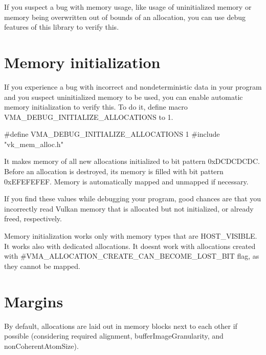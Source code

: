 If you suspect a bug with memory usage, like usage of uninitialized memory or memory being overwritten out of bounds of an allocation, you can use debug features of this library to verify this.\hypertarget{debugging_memory_usage_debugging_memory_usage_initialization}{}\section{Memory initialization}\label{debugging_memory_usage_debugging_memory_usage_initialization}
If you experience a bug with incorrect and nondeterministic data in your program and you suspect uninitialized memory to be used, you can enable automatic memory initialization to verify this. To do it, define macro {\ttfamily V\+M\+A\+\_\+\+D\+E\+B\+U\+G\+\_\+\+I\+N\+I\+T\+I\+A\+L\+I\+Z\+E\+\_\+\+A\+L\+L\+O\+C\+A\+T\+I\+O\+NS} to 1.


\begin{DoxyCode}
\textcolor{preprocessor}{#define VMA\_DEBUG\_INITIALIZE\_ALLOCATIONS 1}
\textcolor{preprocessor}{#include "vk\_mem\_alloc.h"}
\end{DoxyCode}


It makes memory of all new allocations initialized to bit pattern {\ttfamily 0x\+D\+C\+D\+C\+D\+C\+DC}. Before an allocation is destroyed, its memory is filled with bit pattern {\ttfamily 0x\+E\+F\+E\+F\+E\+F\+EF}. Memory is automatically mapped and unmapped if necessary.

If you find these values while debugging your program, good chances are that you incorrectly read Vulkan memory that is allocated but not initialized, or already freed, respectively.

Memory initialization works only with memory types that are {\ttfamily H\+O\+S\+T\+\_\+\+V\+I\+S\+I\+B\+LE}. It works also with dedicated allocations. It doesn\textquotesingle{}t work with allocations created with \#\+V\+M\+A\+\_\+\+A\+L\+L\+O\+C\+A\+T\+I\+O\+N\+\_\+\+C\+R\+E\+A\+T\+E\+\_\+\+C\+A\+N\+\_\+\+B\+E\+C\+O\+M\+E\+\_\+\+L\+O\+S\+T\+\_\+\+B\+IT flag, as they cannot be mapped.\hypertarget{debugging_memory_usage_debugging_memory_usage_margins}{}\section{Margins}\label{debugging_memory_usage_debugging_memory_usage_margins}
By default, allocations are laid out in memory blocks next to each other if possible (considering required alignment, {\ttfamily buffer\+Image\+Granularity}, and {\ttfamily non\+Coherent\+Atom\+Size}).



